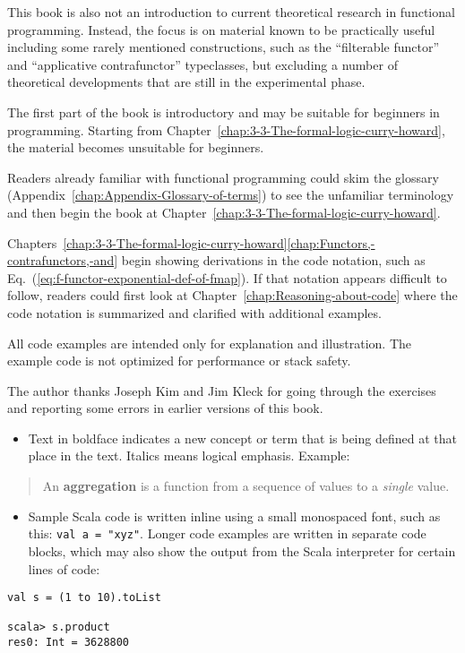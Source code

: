 This book is also not an introduction to current theoretical research
in functional programming. Instead, the focus is on material known
to be practically useful \textemdash{} including some rarely mentioned
constructions, such as the ``filterable functor'' and ``applicative
contrafunctor'' typeclasses, but excluding a number of theoretical
developments that are still in the experimental phase.

The first part of the book is introductory and may be suitable for
beginners in programming. Starting from Chapter~\ref{chap:3-3-The-formal-logic-curry-howard},
the material becomes unsuitable for beginners.

Readers already familiar with functional programming could skim the
glossary (Appendix~\ref{chap:Appendix-Glossary-of-terms}) to see
the unfamiliar terminology and then begin the book at Chapter~\ref{chap:3-3-The-formal-logic-curry-howard}.

Chapters~\ref{chap:3-3-The-formal-logic-curry-howard}\textendash \ref{chap:Functors,-contrafunctors,-and}
begin showing derivations in the code notation, such as Eq.~(\ref{eq:f-functor-exponential-def-of-fmap}).
If that notation appears difficult to follow, readers could first
look at Chapter~\ref{chap:Reasoning-about-code} where the code notation
is summarized and clarified with additional examples.

All code examples are intended only for explanation and illustration.
The example code is not optimized for performance or stack safety.

The author thanks Joseph Kim and Jim Kleck for going through the exercises
and reporting some errors in earlier versions of this book.

\begin{itemize}
\item Text in boldface indicates a new concept or term that is being defined
at that place in the text. Italics means logical emphasis. Example:
\end{itemize}
\begin{quotation}
An \textbf{aggregation} is a function from a sequence
of values to a \emph{single} value.
\end{quotation}
\begin{itemize}
\item Sample Scala code is written inline using a small monospaced font,
such as this: \lstinline!val a = "xyz"!. Longer code examples are
written in separate code blocks, which may also show the output from
the Scala interpreter for certain lines of code:
\end{itemize}
\begin{lstlisting}[mathescape=true]
val s = (1 to 10).toList

scala> s.product
res0: Int = 3628800 
\end{lstlisting}

